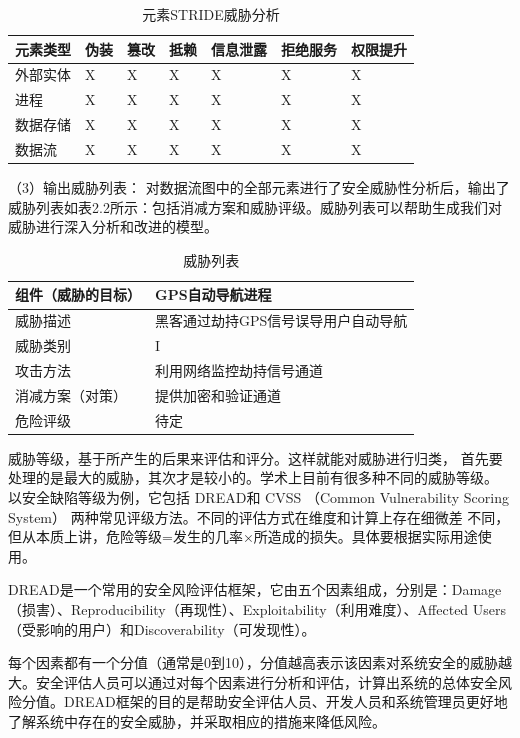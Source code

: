   \begin{table}
    \caption{元素STRIDE威胁分析}
  \begin{center}
    \begin{tabular}{|l|l|l|l|l|l|l}
      \hline 元素类型 & 伪装 & 篡改 & 抵赖 & 信息泄露 & 拒绝服务 & 权限提升\\
      \hline 外部实体 & X & X & X & X & X & X \\
      \hline 进程 & X & X & X & X & X & X \\
      \hline 数据存储 & X & X & X & X & X & X \\
      \hline 数据流 & X & X & X & X & X & X \\
      \hline
      \end{tabular}
  \end{center}
\end{table}
  （3）输出威胁列表：
  对数据流图中的全部元素进行了安全威胁性分析后，输出了威胁列表如表2.2所示：包括消减方案和威胁评级。威胁列表可以帮助生成我们对威胁进行深入分析和改进的模型。
\begin{table}
  \caption{威胁列表}
\begin{center}
  \begin{tabular}{|l|l|}
    \hline 组件（威胁的目标） & GPS自动导航进程 \\
    \hline 威胁描述 & 黑客通过劫持GPS信号误导用户自动导航 \\
    \hline 威胁类别 & I \\
    \hline 攻击方法 & 利用网络监控劫持信号通道 \\
    \hline 消减方案（对策） & 提供加密和验证通道 \\
    \hline 危险评级 & 待定 \\
    \hline
    \end{tabular}
\end{center}
\end{table}
威胁等级，基于所产生的后果来评估和评分。这样就能对威胁进行归类，
首先要处理的是最大的威胁，其次才是较小的。学术上目前有很多种不同的威胁等级。
以安全缺陷等级为例，它包括 DREAD和 CVSS （Common Vulnerability Scoring System）
两种常见评级方法。不同的评估方式在维度和计算上存在细微差
不同，但从本质上讲，危险等级=发生的几率×所造成的损失。具体要根据实际用途使用。

DREAD是一个常用的安全风险评估框架，它由五个因素组成，分别是：Damage（损害）、Reproducibility（再现性）、Exploitability（利用难度）、Affected Users（受影响的用户）和Discoverability（可发现性）。

每个因素都有一个分值（通常是0到10），分值越高表示该因素对系统安全的威胁越大。安全评估人员可以通过对每个因素进行分析和评估，计算出系统的总体安全风险分值。DREAD框架的目的是帮助安全评估人员、开发人员和系统管理员更好地了解系统中存在的安全威胁，并采取相应的措施来降低风险。

